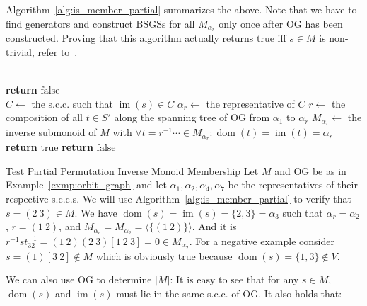 Algorithm~\ref{alg:is_member_partial} summarizes the above. Note that we have
to find generators and construct BSGSs for all $M_{\alpha_r}$ only once after
$\mathrm{OG}$ has been constructed.  Proving that this algorithm actually
returns $\mathrm{true}$ iff $s \in M$ is non-trivial, refer to~\cite{Mitchell}.

\begin{algorithm}
  \caption{Test partial permutation inverse monoid membership.}
  \label{alg:is_member_partial}
  \begin{algorithmic}[1]
      \\
        \State \textbf{return} $\mathrm{false}$
      \EndIf
      \\
      \State $C \gets$ the s.c.c. such that $\operatorname{im}(s) \in C$
      \State $\alpha_r \gets$ the representative of $C$
      \State $r \gets$ the composition of all $t \in S'$ along the spanning tree
              of $\mathrm{OG}$ from $\alpha_1$ to $\alpha_r$
      \State $M_{\alpha_r} \gets$ the inverse submonoid of $M$ with $\forall t
              = r^{-1} \cdots \in M_{\alpha_r}: \operatorname{dom}(t) =
              \operatorname{im}(t) = \alpha_r$
      \\
          \State \textbf{return} $\mathrm{true}$
      \Else
          \State \textbf{return} $\mathrm{false}$
      \EndIf
    \EndProcedure
  \end{algorithmic}
\end{algorithm}

\begin{exmp}{Test Partial Permutation Inverse Monoid Membership}
  Let $M$ and $\mathrm{OG}$ be as in Example~\ref{exmp:orbit_graph} and let
  $\alpha_1, \alpha_2, \alpha_4, \alpha_7$ be the representatives of their
  respective s.c.c.s. We will use Algorithm~\ref{alg:is_member_partial} to verify
  that $s = (2\ 3) \in M$. We have $\operatorname{dom}(s) = \operatorname{im}(s)
  = \{2,3\} = \alpha_3$ such that $\alpha_r = \alpha_2$, $r = (1\ 2)$, and
  $M_{\alpha_r} = M_{\alpha_2} = \langle\{(1\ 2)\}\rangle$.  And it is $r^{-1} s
  t_{32}^{-1} = (1\ 2) (2\ 3) [1\ 2\ 3] = 0 \in M_{\alpha_2}$.
  For a negative example consider $s = (1)[3\ 2] \notin M$ which is obviously
  true because $\operatorname{dom}(s) = \{1,3\} \notin V$.
\end{exmp}
%
We can also use $\mathrm{OG}$ to determine $|M|$: It is easy to see that for
any $s \in M$, $\operatorname{dom}(s)$ and $\operatorname{im}(s)$ must lie in
the same s.c.c. of $\mathrm{OG}$. It also holds that:

